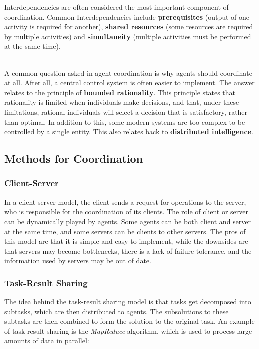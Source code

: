 \documentclass[12pt]{article}
\begin{document}
\noindent
Interdependencies are often considered the most important component of coordination.
Common Interdependencies include \textbf{prerequisites} (output of one activity is required for another), \textbf{shared resources} (some resources are required by multiple activities) and \textbf{simultaneity} (multiple activities must be performed at the same time).

\noindent
\\
A common question asked in agent coordination is why agents should coordinate at all.
After all, a central control system is often easier to implement.
The answer relates to the principle of \textbf{bounded rationality}.
This principle states that rationality is limited when individuals make decisions, and that, under these limitations, rational individuals will select a decision that is satisfactory, rather than optimal.
In addition to this, some modern systems are too complex to be controlled by a single entity.
This also relates back to \textbf{distributed intelligence}.

\subsection{Methods for Coordination}

\subsubsection{Client-Server}
In a client-server model, the client sends a request for operations to the server, who is responsible for the coordination of its clients.
The role of client or server can be dynamically played by agents.
Some agents can be both client and server at the same time, and some servers can be clients to other servers.
The pros of this model are that it is simple and easy to implement, while the downsides are that servers may become bottlenecks, there is a lack of failure tolerance, and the information used by servers may be out of date.

\newpage
\subsubsection{Task-Result Sharing}
The idea behind the task-result sharing model is that tasks get decomposed into subtasks, which are then distributed to agents.
The subsolutions to these subtasks are then combined to form the solution to the original task.
An example of task-result sharing is the \textit{MapReduce} algorithm, which is used to process large amounts of data in parallel:
\end{document}
